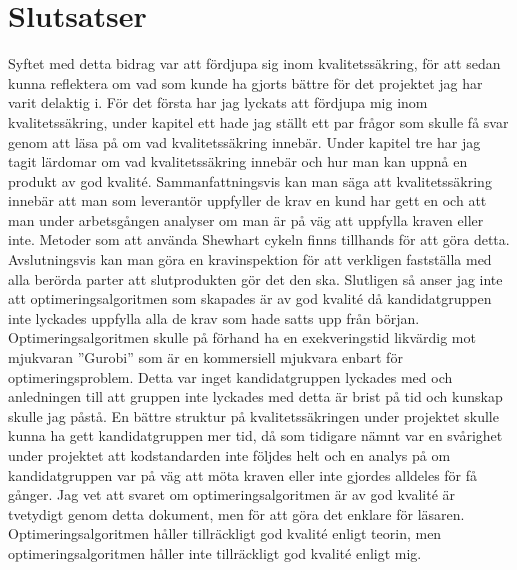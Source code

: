 \section{Slutsatser}
Syftet med detta bidrag var att fördjupa sig inom kvalitetssäkring, för att sedan kunna reflektera om vad som kunde ha gjorts bättre för det projektet jag har varit delaktig i.
\newline
\newline
För det första har jag lyckats att fördjupa mig inom kvalitetssäkring, under kapitel ett hade jag ställt ett par frågor som skulle få svar genom att läsa på om vad kvalitetssäkring innebär. Under kapitel tre har jag tagit lärdomar om vad kvalitetssäkring innebär och hur man kan uppnå en produkt av god kvalité. Sammanfattningsvis kan man säga att kvalitetssäkring innebär att man som leverantör uppfyller de krav en kund har gett en och att man under arbetsgången analyser om man är på väg att uppfylla kraven eller inte. Metoder som att använda Shewhart cykeln finns tillhands för att göra detta. Avslutningsvis kan man göra en kravinspektion för att verkligen fastställa med alla berörda parter att slutprodukten gör det den ska.
\newline
\newline
Slutligen så anser jag inte att optimeringsalgoritmen som skapades är av god kvalité då kandidatgruppen inte lyckades uppfylla alla de krav som hade satts upp från början. Optimeringsalgoritmen skulle på förhand ha en exekveringstid likvärdig mot mjukvaran ''Gurobi'' som är en kommersiell mjukvara enbart för optimeringsproblem. Detta var inget kandidatgruppen lyckades med och anledningen till att gruppen inte lyckades med detta är brist på tid och kunskap skulle jag påstå. En bättre struktur på kvalitetssäkringen under projektet skulle kunna ha gett kandidatgruppen mer tid, då som tidigare nämnt var en svårighet under projektet att kodstandarden inte följdes helt och en analys på om kandidatgruppen var på väg att möta kraven eller inte gjordes alldeles för få gånger. Jag vet att svaret om optimeringsalgoritmen är av god kvalité är tvetydigt genom detta dokument, men för att göra det enklare för läsaren. Optimeringsalgoritmen håller tillräckligt god kvalité enligt teorin, men optimeringsalgoritmen håller inte tillräckligt god kvalité enligt mig.
